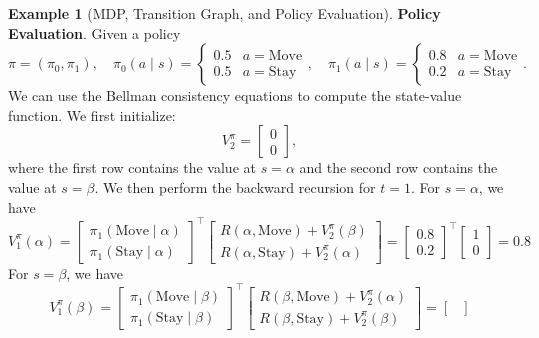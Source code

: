 \documentclass[
]{book}
\theoremstyle{definition}
\theoremstyle{definition}
\newtheorem{example}{Example}[chapter]
\theoremstyle{definition}
\theoremstyle{definition}
\theoremstyle{remark}
\begin{document}
\begin{example}[MDP, Transition Graph, and Policy Evaluation]
\textbf{Policy Evaluation}. Given a policy
\begin{equation}
\pi = (\pi_0, \pi_1), \quad \pi_0(a \mid s) = \begin{cases}
0.5 & a = \text{Move} \\
0.5 & a = \text{Stay}
\end{cases}, 
\quad 
\pi_1( a \mid s) = \begin{cases}
0.8 & a = \text{Move} \\
0.2 & a = \text{Stay}
\end{cases}.
\end{equation}
We can use the Bellman consistency equations to compute the state-value function. We first initialize:
\[
V^{\pi}_2 = \begin{bmatrix}
0 \\ 0
\end{bmatrix},
\]
where the first row contains the value at \(s = \alpha\) and the second row contains the value at \(s = \beta\).
We then perform the backward recursion for \(t=1\). For \(s = \alpha\), we have
\begin{equation}
V^{\pi}_1(\alpha) = \begin{bmatrix}
\pi_1(\text{Move} \mid \alpha) \\
\pi_1(\text{Stay} \mid \alpha)
\end{bmatrix}^{\top} \begin{bmatrix}
R(\alpha, \text{Move}) + V^{\pi}_2(\beta) \\
R(\alpha, \text{Stay}) + V^{\pi}_2(\alpha)
\end{bmatrix} = \begin{bmatrix}
0.8 \\ 0.2
\end{bmatrix}^{\top}
\begin{bmatrix}
1 \\ 0
\end{bmatrix} = 0.8 
\end{equation}
For \(s = \beta\), we have
\begin{equation}
V^{\pi}_1(\beta) = \begin{bmatrix}
\pi_1(\text{Move} \mid \beta) \\
\pi_1(\text{Stay} \mid \beta)
\end{bmatrix}^{\top} \begin{bmatrix}
R(\beta, \text{Move}) + V^{\pi}_2(\alpha) \\
R(\beta, \text{Stay}) + V^{\pi}_2(\beta)
\end{bmatrix} = \begin{bmatrix}

\end{bmatrix}
\end{equation}
\end{example}
\end{document}
